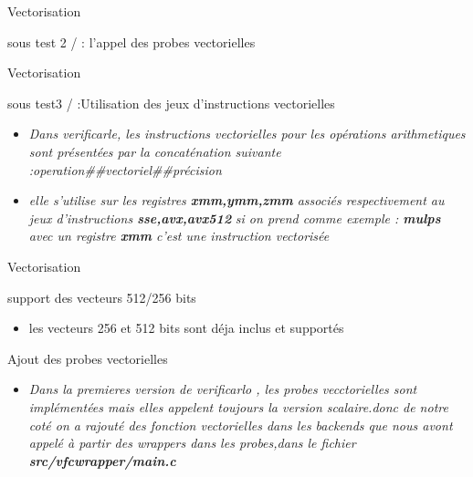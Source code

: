 \documentclass{beamer}
\begin{document}
\begin{frame}{Vectorisation}
\begin{block}{sous test 2 / : l'appel des probes vectorielles}
\end{block}

  
        
\end{frame}

\begin{frame}{Vectorisation}   

\begin{block}{sous test3 / :Utilisation des jeux d’instructions vectorielles}
     \begin{itemize}
     \item\textit{Dans verificarle, les instructions vectorielles pour les opérations arithmetiques sont présentées par la concaténation suivante :operation##vectoriel##précision } 
      \item\textit{elle s'utilise sur les registres \textbf{xmm,ymm,zmm } associés respectivement au jeux d'instructions \textbf{sse,avx,avx512} } 
      \textit{si on prend comme exemple : \textbf{mulps} avec un registre \textbf{xmm} c'est une instruction vectorisée} 
   \end{itemize}
  \end{block}
 \end{frame}

\begin{frame}{Vectorisation}         
\begin{block}{support des vecteurs 512/256 bits}
     \begin{itemize}
         \item les vecteurs 256 et 512 bits sont déja inclus et supportés
     \end{itemize}
     
\end{block}
\begin{block}{Ajout des probes vectorielles}
    \begin{itemize}
    \item\textit{Dans la premieres version de verificarlo , les probes vecctorielles sont implémentées mais elles appelent toujours la version scalaire.donc de notre coté on a rajouté des fonction vectorielles dans les backends que nous avont appelé à partir des wrappers dans les probes,dans le fichier \textbf{src/vfcwrapper/main.c} } 
   \end{itemize}  
\end{block}
 \end{frame}
\end{document}
